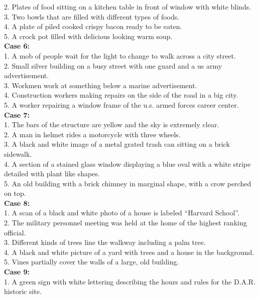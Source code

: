 \documentclass[10pt,twocolumn,letterpaper]{article}
\begin{document}
{{2. Plates of food sitting on a kitchen table in front of window with white blinds.\\
3. Two bowls that are filled with different types of foods.\\
4. A plate of piled cooked crispy bacon ready to be eaten.\\
5. A crock pot filled with delicious looking warm soup.\\
\textbf{Case 6:}\\
1. A mob of people wait for the light to change to walk across a city street.\\
2. Small silver building on a busy street with one guard and a us army advertisement.\\
3. Workmen work at something below a marine advertisement.\\
4. Construction workers making repairs on the side of the road in a big city.\\
5. A worker repairing a window frame of the u.s. armed forces career center.\\
\textbf{Case 7:}\\
1. The bars of the structure are yellow and the sky is extremely clear.\\
2. A man in helmet rides a motorcycle with three wheels.\\
3. A black and white image of a metal grated trash can sitting on a brick sidewalk.\\
4. A section of a stained glass window displaying a blue oval with a white stripe detailed with plant like shapes.\\
5. An old building with a brick chimney in marginal shape, with a crow perched on top.\\
\textbf{Case 8:}\\
1. A scan of a black and white photo of a house is labeled ``Harvard School''.\\
2. The military personnel meeting was held at the home of the highest ranking official.\\
3. Different kinds of trees line the walkway including a palm tree.\\
4. A black and white picture of a yard with trees and a house in the background.\\
5. Vines partially cover the walls of a large, old building.\\
\textbf{Case 9:}\\
1. A green sign with white lettering describing the hours and rules for the D.A.R. historic site.\\
}}
\end{document}
